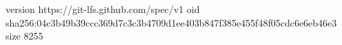 version https://git-lfs.github.com/spec/v1
oid sha256:04c3b49b39ccc369d7c3c3b4709d1ee403b847f385e455f48f05cdc6e6eb46e3
size 8255
